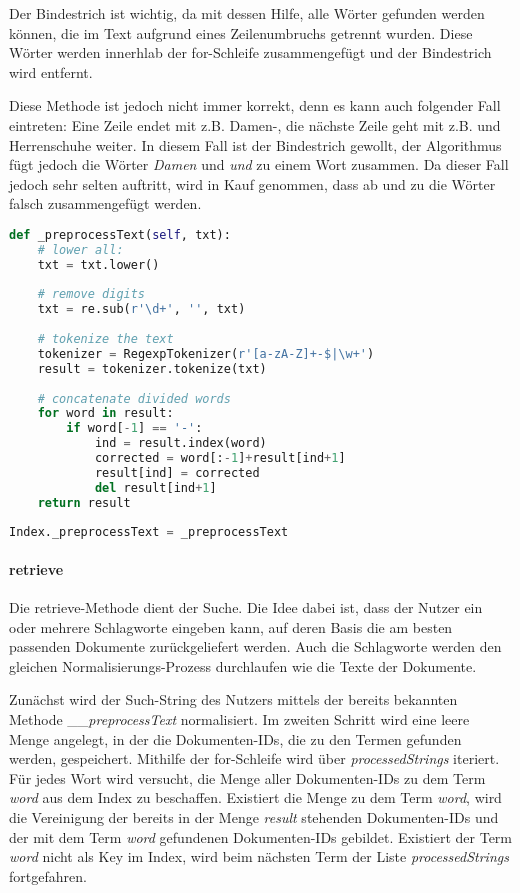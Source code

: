Der Bindestrich ist wichtig, da mit dessen Hilfe, alle Wörter gefunden
werden können, die im Text aufgrund eines Zeilenumbruchs getrennt
wurden. Diese Wörter werden innerhlab der for-Schleife zusammengefügt
und der Bindestrich wird entfernt.

Diese Methode ist jedoch nicht immer korrekt, denn es kann auch
folgender Fall eintreten: Eine Zeile endet mit z.B. Damen-, die nächste
Zeile geht mit z.B. und Herrenschuhe weiter. In diesem Fall ist der
Bindestrich gewollt, der Algorithmus fügt jedoch die Wörter \emph{Damen}
und \emph{und} zu einem Wort zusammen. Da dieser Fall jedoch sehr selten
auftritt, wird in Kauf genommen, dass ab und zu die Wörter falsch
zusammengefügt werden.

\begin{lstlisting}[language=Python]
def _preprocessText(self, txt):
    # lower all:
    txt = txt.lower()
    
    # remove digits
    txt = re.sub(r'\d+', '', txt)
            
    # tokenize the text
    tokenizer = RegexpTokenizer(r'[a-zA-Z]+-$|\w+')
    result = tokenizer.tokenize(txt)
    
    # concatenate divided words
    for word in result:
        if word[-1] == '-':
            ind = result.index(word)
            corrected = word[:-1]+result[ind+1]
            result[ind] = corrected
            del result[ind+1]
    return result
    
Index._preprocessText = _preprocessText
\end{lstlisting}

\paragraph{retrieve}\label{retrieve}

Die retrieve-Methode dient der Suche. Die Idee dabei ist, dass der
Nutzer ein oder mehrere Schlagworte eingeben kann, auf deren Basis die
am besten passenden Dokumente zurückgeliefert werden. Auch die
Schlagworte werden den gleichen Normalisierungs-Prozess durchlaufen wie
die Texte der Dokumente.

Zunächst wird der Such-String des Nutzers mittels der bereits bekannten
Methode \_\_\emph{preprocessText} normalisiert. Im zweiten Schritt wird
eine leere Menge angelegt, in der die Dokumenten-IDs, die zu den Termen
gefunden werden, gespeichert. Mithilfe der for-Schleife wird über
\emph{processedStrings} iteriert. Für jedes Wort wird versucht, die
Menge aller Dokumenten-IDs zu dem Term \emph{word} aus dem Index zu
beschaffen. Existiert die Menge zu dem Term \emph{word}, wird die
Vereinigung der bereits in der Menge \emph{result} stehenden
Dokumenten-IDs und der mit dem Term \emph{word} gefundenen
Dokumenten-IDs gebildet. Existiert der Term \emph{word} nicht als Key im
Index, wird beim nächsten Term der Liste \emph{processedStrings}
fortgefahren.

